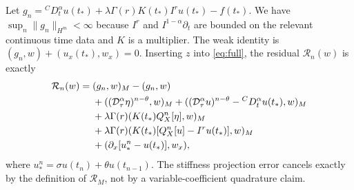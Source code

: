 \documentclass[11pt,a4paper]{article}
\newcommand{\norm}[1]{\lVert#1\rVert}
\newcommand{\D}{\mathcal D_\tau^\alpha}
\begin{document}
Let $g_n={}^CD_t^\alpha u(t_*)+\lambda\Gamma(r)K(t_*)I^ru(t_*)-f(t_*)$. We have $\sup_n\norm{g_n}_{H^m}<\infty$ because $I^r$ and $I^{1-\alpha}\partial_t$ are bounded on the relevant continuous time data and $K$ is a multiplier. The weak identity is $(g_n,w)+(u_x(t_*),w_x)=0$. Inserting $z$ into \eqref{eq:full}, the residual $\mathcal R_n(w)$ is exactly
\begin{align}
 \mathcal R_n(w)={}&(g_n,w)_M-(g_n,w)\notag\\
 &+((\D\eta)^{n-\theta},w)_M
 +((\D u)^{n-\theta}-{}^CD_t^\alpha u(t_*),w)_M\notag\\
 &+\lambda\Gamma(r)(K(t_*) Q_X^n[\eta],w)_M\notag\\
 &+\lambda\Gamma(r)(K(t_*)[Q_X^n[u]-I^ru(t_*)],w)_M\notag\\
 &+(\partial_x[u_*^n-u(t_*)],w_x),\label{eq:res}
\end{align}
where $u_*^n=\sigma u(t_n)+\theta u(t_{n-1})$. The stiffness projection error cancels exactly by the definition of $\mathcal R_M$, not by a variable-coefficient quadrature claim.
\end{document}
